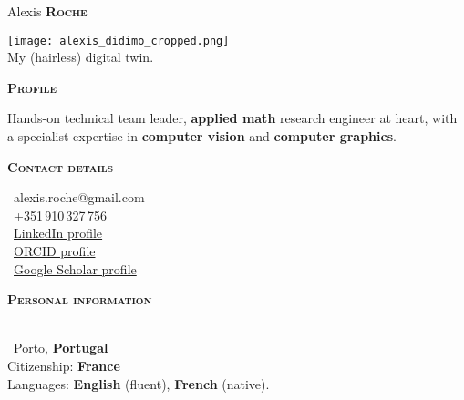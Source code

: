 \documentclass[11pt, a4paper]{article}
\newcommand{\headleft}[1]{\vspace*{3ex}\textsc{\textbf{#1}}\par%
    \vspace*{-1.5ex}\hrulefill\par\vspace*{0.7ex}}
\begin{document}
\setlength{\topskip}{0pt}
\setlength{\parindent}{0pt}
\setlength{\parskip}{0pt}
\setlength{\fboxsep}{0pt}
\pagestyle{empty}
\raggedbottom

\begin{minipage}[t]{0.33\textwidth} %
\colorbox{cvblue}{\begin{minipage}[t][5mm][t]{\textwidth}\null\hfill\null\end{minipage}}

\vspace{-.2ex} %
\colorbox{cvblue!90}{\color{white}  %
\textwidth\relax%
\begin{minipage}[t][293mm][t]{0.82\textwidth}
\raggedright
\vspace*{2.5ex}

\Large Alexis \textbf{\textsc{Roche}} \normalsize 

\null\hfill
\begin{center}
  \texttt{[image: alexis\_didimo\_cropped.png]}\\
  {\scriptsize My (hairless) digital twin.}
\end{center}
\hfill\null

\vspace*{0.5ex} %

\headleft{Profile}
 Hands-on technical team leader, {\bf applied math} research engineer at heart, with a specialist expertise in {\bf computer vision} and {\bf computer graphics}. 

\headleft{Contact details}
\small %
\MVAt\ {\small alexis.roche@gmail.com} \\[0.4ex]
\Mobilefone\ +351\,910\,327\,756 \\[0.5ex]
\Mundus\ \href{https://www.linkedin.com/in/alexis-roche-3815592}{LinkedIn profile} \\[0.1ex]
\Mundus\ \href{https://orcid.org/0000-0002-4821-6893}{ORCID profile} \\[0.1ex]
\Mundus\ \href{https://scholar.google.com/citations?user=LJJTi1gAAAAJ&hl}{Google Scholar profile} %
\normalsize

\headleft{Personal information}
\MALE \\[0.5ex]
\Letter\ Porto, {\bf Portugal} \\[0.5ex]
Citizenship: {\bf France} \\[0.5ex]
Languages: {\bf English} (fluent), {\bf French} (native).


\end{minipage}}
\end{minipage}
\end{document}
